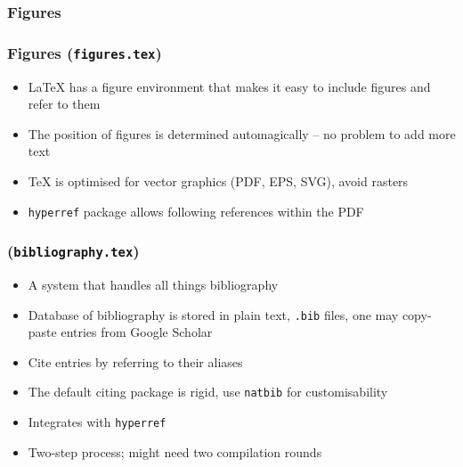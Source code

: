 \documentclass[xetex,colorlinks]{beamer} %
\begin{document}
  \subsubsection{Figures}
  \begin{frame}
    \frametitle{Figures (\texttt{figures.tex})}
    \begin{itemize}
     \item \LaTeX{} has a figure environment that makes it easy to include figures and refer to them
     \item The position of figures is determined automagically – no problem to add more text
     \item \TeX{} is optimised for vector graphics (PDF, EPS, SVG), avoid rasters
     \item \texttt{hyperref} package allows following references within the PDF
    \end{itemize}
  \end{frame}
  
  \subsubsection{}
  \begin{frame}
    \frametitle{ (\texttt{bibliography.tex})}
    \begin{itemize}
     \item A system that handles all things bibliography
     \item Database of bibliography is stored in plain text, \texttt{.bib} files, one may copy-paste entries from Google Scholar
     \item Cite entries by referring to their aliases
     \item The default citing package is rigid, use \texttt{natbib} for customisability
     \item Integrates with \texttt{hyperref}
     \item Two-step process; might need two compilation rounds
    \end{itemize}
  \end{frame}
  
\end{document}
